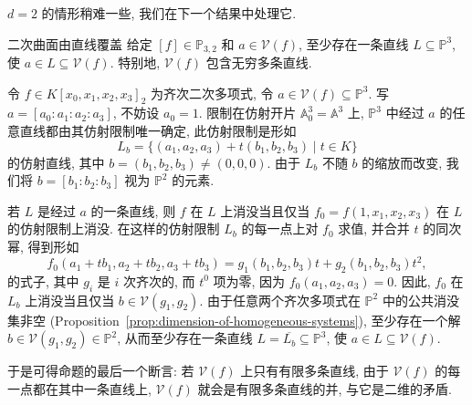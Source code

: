 $d=2$ 的情形稍难一些, 我们在下一个结果中处理它.

\begin{Proposition}{二次曲面由直线覆盖}\leavevmode\label{prop:quadric-surfaces-are-covered-by-lines}
给定 $[f]\in\mathbb{P}_{3,2}$ 和 $a\in\mathcal{V}(f)$, 至少存在一条直线 $L\subseteq\mathbb{P}^{3}$, 使 $a\in L\subseteq\mathcal{V}(f)$. 特别地, $\mathcal{V}(f)$ 包含无穷多条直线.
\end{Proposition}
\begin{Proof}
令 $f\in K[x_{0},x_{1},x_{2},x_{3}]_{2}$ 为齐次二次多项式, 令 $a\in\mathcal{V}(f)\subseteq\mathbb{P}^{3}$. 写 $a=[a_{0}:a_{1}:a_{2}:a_{3}]$, 不妨设 $a_{0}=1$. 限制在仿射开片 $\mathbb{A}_{0}^{3}=\mathbb{A}^{3}$ 上, $\mathbb{P}^{3}$ 中经过 $a$ 的任意直线都由其仿射限制唯一确定, 此仿射限制是形如
\[
  L_{b}=\{(a_{1},a_{2},a_{3})+t(b_{1},b_{2},b_{3})\mid t\in K\}
\]
的仿射直线, 其中 $b=(b_{1},b_{2},b_{3})\ne(0,0,0)$. 由于 $L_{b}$ 不随 $b$ 的缩放而改变, 我们将 $b=[b_{1}:b_{2}:b_{3}]$ 视为 $\mathbb{P}^{2}$ 的元素.

若 $L$ 是经过 $a$ 的一条直线, 则 $f$ 在 $L$ 上消没当且仅当 $f_{0}=f(1,x_{1},x_{2},x_{3})$ 在 $L$ 的仿射限制上消没. 在这样的仿射限制 $L_{b}$ 的每一点上对 $f_{0}$ 求值, 并合并 $t$ 的同次幂, 得到形如
\begin{equation}\label{eq:degree-two-restriction-to-affine-line-through-point}
  f_{0}(a_{1}+tb_{1},a_{2}+tb_{2},a_{3}+tb_{3})
  =g_{1}(b_{1},b_{2},b_{3})t+g_{2}(b_{1},b_{2},b_{3})t^{2},
\end{equation}
的式子, 其中 $g_{i}$ 是 $i$ 次齐次的, 而 $t^{0}$ 项为零, 因为 $f_{0}(a_{1},a_{2},a_{3})=0$. 因此, $f_{0}$ 在 $L_{b}$ 上消没当且仅当 $b\in\mathcal{V}(g_{1},g_{2})$. 由于任意两个齐次多项式在 $\mathbb{P}^{2}$ 中的公共消没集非空 (Proposition~\ref{prop:dimension-of-homogeneous-systems}), 至少存在一个解 $b\in\mathcal{V}(g_{1},g_{2})\in\mathbb{P}^{2}$, 从而至少存在一条直线 $L=\overline{L_{b}}\subseteq\mathbb{P}^{3}$, 使 $a\in L\subseteq\mathcal{V}(f)$.

于是可得命题的最后一个断言: 若 $\mathcal{V}(f)$ 上只有有限多条直线, 由于 $\mathcal{V}(f)$ 的每一点都在其中一条直线上, $\mathcal{V}(f)$ 就会是有限多条直线的并, 与它是二维的矛盾.
\end{Proof}

